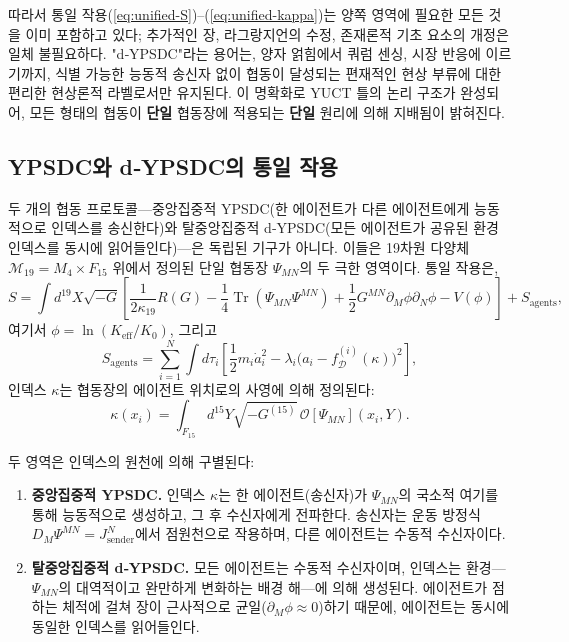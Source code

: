\documentclass[12pt,a4paper]{article}
\DeclareMathOperator{\Tr}{Tr}
\begin{document}
	따라서 통일 작용(\ref{eq:unified-S})--(\ref{eq:unified-kappa})는 양쪽 영역에 필요한 모든 것을 이미 포함하고 있다; 추가적인 장, 라그랑지언의 수정, 존재론적 기초 요소의 개정은 일체 불필요하다.
	"d‑YPSDC"라는 용어는, 양자 얽힘에서 쿼럼 센싱, 시장 반응에 이르기까지, 식별 가능한 능동적 송신자 없이 협동이 달성되는 편재적인 현상 부류에 대한 편리한 현상론적 라벨로서만 유지된다. 이 명확화로 YUCT 틀의 논리 구조가 완성되어, 모든 형태의 협동이 \textbf{단일} 협동장에 적용되는 \textbf{단일} 원리에 의해 지배됨이 밝혀진다.
	
	\subsection{YPSDC와 d‑YPSDC의 통일 작용}
	\label{subsec:unified-action}
	
	두 개의 협동 프로토콜—중앙집중적 YPSDC(한 에이전트가 다른 에이전트에게 능동적으로 인덱스를 송신한다)와 탈중앙집중적 d‑YPSDC(모든 에이전트가 공유된 환경 인덱스를 동시에 읽어들인다)—은 독립된 기구가 아니다. 이들은 19차원 다양체 \(\mathcal{M}_{19}=M_4\times F_{15}\) 위에서 정의된 단일 협동장 \(\Psi_{MN}\)의 두 극한 영역이다. 통일 작용은,
	\begin{equation}
		S = \int d^{19}X \sqrt{-G} \left[ \frac{1}{2\kappa_{19}} R(G)
		- \frac{1}{4} \Tr(\Psi_{MN}\Psi^{MN}) + \frac{1}{2} G^{MN}\partial_M\phi \partial_N\phi
		- V(\phi) \right] + S_{\mathrm{agents}},
		\label{eq:unified-S}
	\end{equation}
	여기서 \(\phi = \ln(K_{\mathrm{eff}}/K_0)\), 그리고
	\begin{equation}
		S_{\mathrm{agents}} = \sum_{i=1}^{N} \int d\tau_i \left[ \frac{1}{2} m_i \dot a_i^2
		- \lambda_i \bigl( a_i - f_{\mathcal{D}}^{(i)}(\kappa) \bigr)^2 \right],
		\label{eq:unified-agents}
	\end{equation}
	인덱스 \(\kappa\)는 협동장의 에이전트 위치로의 사영에 의해 정의된다:
	\begin{equation}
		\kappa(x_i) = \int_{F_{15}} d^{15}Y \sqrt{-G^{(15)}}\,
		\mathcal{O}[\Psi_{MN}](x_i, Y).
		\label{eq:unified-kappa}
	\end{equation}
	
	두 영역은 인덱스의 원천에 의해 구별된다:
	
	\begin{enumerate}[leftmargin=*, label=\textbf{(\arabic*)}]
		\item \textbf{중앙집중적 YPSDC.} 인덱스 \(\kappa\)는 한 에이전트(송신자)가 \(\Psi_{MN}\)의 국소적 여기를 통해 능동적으로 생성하고, 그 후 수신자에게 전파한다. 송신자는 운동 방정식 \(D_M\Psi^{MN} = J^{N}_{\mathrm{sender}}\)에서 점원천으로 작용하며, 다른 에이전트는 수동적 수신자이다.
		\item \textbf{탈중앙집중적 d‑YPSDC.} 모든 에이전트는 수동적 수신자이며, 인덱스는 환경—\(\Psi_{MN}\)의 대역적이고 완만하게 변화하는 배경 해—에 의해 생성된다. 에이전트가 점하는 체적에 걸쳐 장이 근사적으로 균일(\(\partial_M\phi \approx 0\))하기 때문에, 에이전트는 동시에 동일한 인덱스를 읽어들인다.
	\end{enumerate}
	
\end{document}
